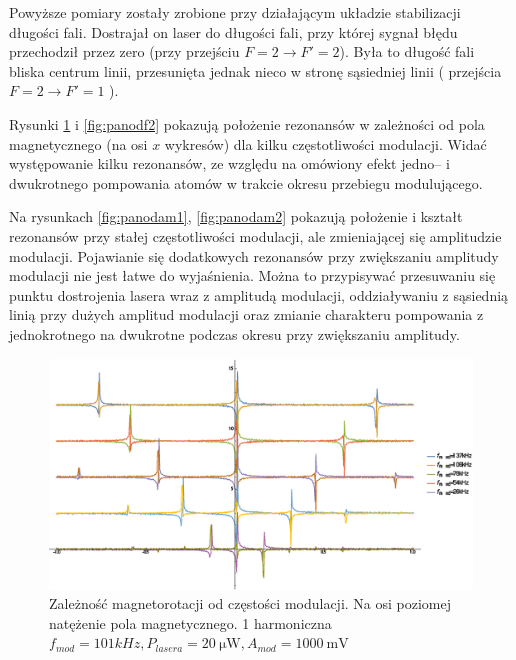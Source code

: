 \documentclass[a4paper,10pt,twoside]{report}
\begin{document}
Powyższe pomiary zostały zrobione przy działającym układzie stabilizacji długości fali. Dostrajał on laser do długości fali, przy której sygnał błędu przechodził przez zero (przy przejściu $F=2 \rightarrow F'=2$). Była to długość fali bliska centrum linii, przesunięta jednak nieco w stronę sąsiedniej linii ( przejścia $F=2 \rightarrow F'=1$ ).

Rysunki \ref{fig:panodf1} i \ref{fig:panodf2} pokazują położenie rezonansów w zależności od pola magnetycznego (na osi $x$ wykresów) dla kilku częstotliwości modulacji. Widać występowanie kilku rezonansów, ze względu na omówiony efekt jedno-- i dwukrotnego pompowania atomów w trakcie okresu przebiegu modulującego.

Na rysunkach \ref{fig:panodam1}, \ref{fig:panodam2} pokazują położenie i kształt rezonansów przy stałej częstotliwości modulacji, ale zmieniającej się amplitudzie modulacji. Pojawianie się dodatkowych rezonansów przy zwiększaniu amplitudy modulacji nie jest łatwe do wyjaśnienia. Można to przypisywać przesuwaniu się punktu dostrojenia lasera wraz z amplitudą modulacji, oddziaływaniu z sąsiednią linią przy dużych amplitud modulacji oraz zmianie charakteru pompowania z jednokrotnego na dwukrotne podczas okresu przy zwiększaniu amplitudy.


\begin{figure}[h!]
\centering
 \includegraphics[width=\textwidth]{panoramy_1H_odf.eps}
 \caption{Zależność magnetorotacji od częstości modulacji. Na osi poziomej natężenie pola magnetycznego. 1 harmoniczna $f_{mod}=101kHz, P_{lasera}=20~\mathrm{ \mu W}, A_{mod}=1000~\mathrm{mV}$}
 \label{fig:panodf1}
\end{figure}
\end{document}
